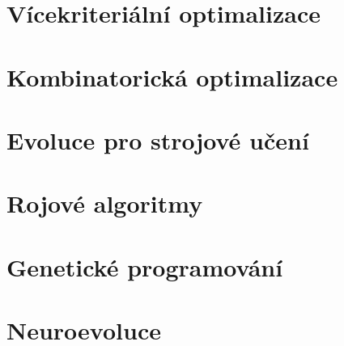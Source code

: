 \documentclass[a4paper,nofonts,nohyper,justified,colorinlistoftodos,hidelinks]{tufte-book}
\begin{document}
\chapter{Vícekriteriální optimalizace}


\chapter{Kombinatorická optimalizace}


\chapter{Evoluce pro strojové učení}


\chapter{Rojové algoritmy}


\chapter{Genetické programování}


\chapter{Neuroevoluce}





\backmatter

\setcounter{tocdepth}{2}
\tableofcontents
\listoffigures
\listoftables
\listofalgorithms 
\printindex
\listoftodos

\nocite{*}


\end{document}

